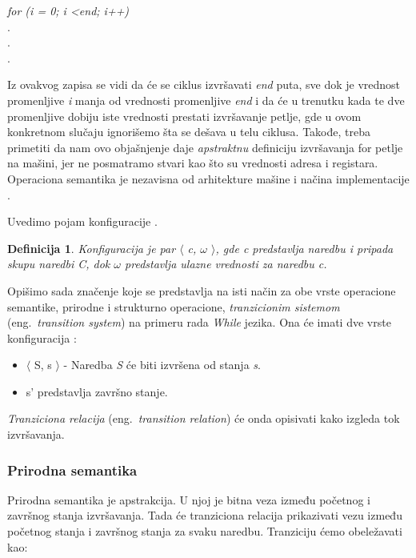 \documentclass[a4paper]{article}
\newtheorem{definicija}{Definicija}[section]
\begin{document}
{\begin{center}\textit{for (i = 0; i \textless end; i++)}
\\.
\\.
\\.
\end{center}
\hfill \break

Iz ovakvog zapisa se vidi da će se ciklus izvršavati \textit{end} puta, sve dok je vrednost promenljive \textit{i} manja od vrednosti promenljive \textit{end} i da će u trenutku kada te dve promenljive dobiju iste vrednosti prestati izvršavanje petlje, gde u ovom konkretnom slučaju ignorišemo šta se dešava u telu ciklusa. Takođe, treba primetiti da nam ovo objašnjenje daje \textit{apstraktnu} definiciju izvršavanja for petlje na mašini, jer ne posmatramo stvari kao što su vrednosti adresa i registara. Operaciona semantika je nezavisna od arhitekture mašine i načina implementacije \cite{parezanovic}.


Uvedimo pojam konfiguracije \cite{opersem2}.
\begin{definicija}
Konfiguracija je par $\langle$ \textit{c, $\omega$} $\rangle$, gde \textit{c} predstavlja naredbu i pripada skupu naredbi \textit{C}, dok $\omega$ predstavlja ulazne vrednosti za naredbu \textit{c}.
\end{definicija}
Opišimo sada značenje koje se predstavlja na isti način za obe vrste operacione semantike, prirodne i strukturno operacione, \textit{tranzicionim sistemom} (eng.~{\em transition system}) na primeru rada \emph{While} jezika. Ona će imati dve vrste konfiguracija \cite{wiley}:
\begin{itemize}
	\item $\langle$ S, s $\rangle$ - Naredba \textit{S} će biti izvršena od stanja \textit{s}.
	\item s' predstavlja završno stanje.
\end{itemize}
\textit{Tranziciona relacija} (eng.~{\em transition relation}) će onda opisivati kako izgleda tok izvršavanja. \\
 
\subsubsection{Prirodna semantika}

\qquad Prirodna semantika je apstrakcija. U njoj je bitna veza između početnog i završnog stanja izvršavanja. Tada će tranziciona relacija prikazivati vezu između početnog stanja i završnog stanja za svaku naredbu. Tranziciju ćemo obeležavati kao:

}
\end{document}
